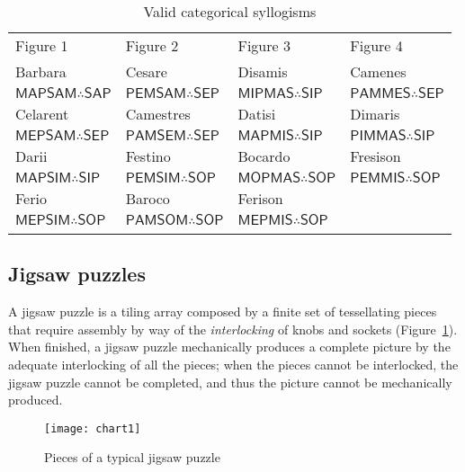 \documentclass[a4paper,UKenglish]{lipics}
\begin{document}
\begin{table}[h]
\caption{Valid categorical syllogisms}
\label{tab:1}      
\begin{tabular}{llll}
\hline\noalign{\smallskip}
Figure 1 & Figure 2 & Figure 3 & Figure 4 \\
\noalign{\smallskip}\hline\noalign{\smallskip}
Barbara 		  & Cesare 			& Disamis 		    & Camenes 			\\
$\mathsf{MAP}\mathsf{SAM}\therefore\mathsf{SAP}$ & $\mathsf{PEM}\mathsf{SAM}\therefore\mathsf{SEP}$ & $\mathsf{MIP}\mathsf{MAS}\therefore\mathsf{SIP}$ & $\mathsf{PAM}\mathsf{MES}\therefore\mathsf{SEP}$ \\
Celarent 		  & Camestres 			& Datisi 		    & Dimaris 			\\
$\mathsf{MEP}\mathsf{SAM}\therefore\mathsf{SEP}$ &$\mathsf{PAM}\mathsf{SEM}\therefore\mathsf{SEP}$ & $\mathsf{MAP}\mathsf{MIS}\therefore\mathsf{SIP}$ & $\mathsf{PIM}\mathsf{MAS}\therefore\mathsf{SIP}$ \\
Darii 			  & Festino 			& Bocardo 		    & Fresison 			\\ 
$\mathsf{MAP}\mathsf{SIM}\therefore\mathsf{SIP}$ & $\mathsf{PEM}\mathsf{SIM}\therefore\mathsf{SOP}$ & $\mathsf{MOP}\mathsf{MAS}\therefore\mathsf{SOP}$ & $\mathsf{PEM}\mathsf{MIS}\therefore\mathsf{SOP}$ \\
Ferio 			  & Baroco  			& Ferison 		    &        			\\  
$\mathsf{MEP}\mathsf{SIM}\therefore\mathsf{SOP}$ & $\mathsf{PAM}\mathsf{SOM}\therefore\mathsf{SOP}$ & $\mathsf{MEP}\mathsf{MIS}\therefore\mathsf{SOP}$ & 				\\
\noalign{\smallskip}\hline
\end{tabular}
\end{table} 

\subsection{Jigsaw puzzles}
A jigsaw puzzle is a tiling array composed by a finite set of tessellating pieces that require assembly by way of the \textit{interlocking} of knobs and sockets (Figure~\ref{fig:0}). When finished, a jigsaw puzzle mechanically produces a complete picture by the adequate interlocking of all the pieces; when the pieces cannot be interlocked, the jigsaw puzzle cannot be completed, and thus the picture cannot be mechanically produced.

\begin{figure}[h]
  \texttt{[image: chart1]}
  \caption{Pieces of a typical jigsaw puzzle}
  \label{fig:0}
\end{figure}
\end{document}
